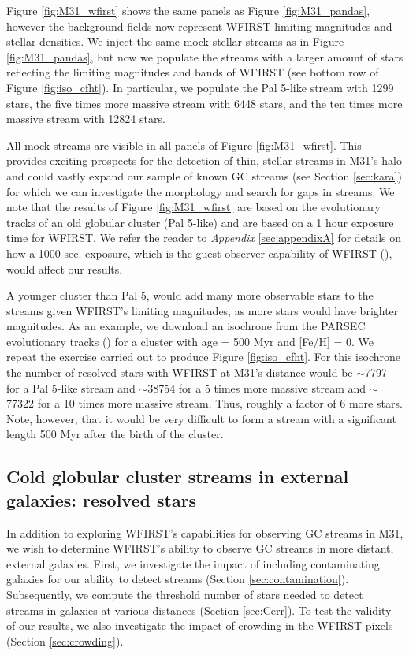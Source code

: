 \documentclass[twocolumn]{aastex62}
\begin{document}
Figure \ref{fig:M31_wfirst} shows the same panels as Figure \ref{fig:M31_pandas}, however the background fields now represent WFIRST limiting magnitudes and stellar densities. We inject the same mock stellar streams as in Figure \ref{fig:M31_pandas}, but now we populate the streams with a larger amount of stars reflecting the limiting magnitudes and bands of WFIRST (see bottom row of Figure \ref{fig:iso_cfht}). In particular, we populate the Pal 5-like stream with 1299 stars, the five times more massive stream with 6448 stars, and the ten times more massive stream with 12824 stars.

All mock-streams are visible in all panels of Figure \ref{fig:M31_wfirst}. This provides exciting prospects for the detection of thin, stellar streams in M31's halo and could vastly expand our sample of known GC streams (see Section \ref{sec:kara}) for which we can investigate the morphology and search for gaps in streams. We note that the results of  Figure \ref{fig:M31_wfirst} are based on the evolutionary tracks of an old globular cluster (Pal 5-like) and are based on a 1 hour exposure time for WFIRST. We refer the reader to {\it Appendix} \ref{sec:appendixA} for details on how a 1000 sec. exposure, which is the guest observer capability of WFIRST (\citealt{spergel13}), would affect our results. 

A younger cluster than Pal 5, would add many more observable stars to the streams given WFIRST's limiting magnitudes, as more stars would have brighter magnitudes. As an example, we download an isochrone from the PARSEC evolutionary tracks (\citealt{bressan12}) for a cluster with age = 500 Myr and  [Fe/H] = 0. We repeat the exercise carried out to produce Figure \ref{fig:iso_cfht}. For this isochrone the number of resolved stars with WFIRST at M31's distance would be ${\sim}$7797 for a Pal 5-like stream and ${\sim}$38754 for a 5  times more massive stream and ${\sim}$77322 for a 10 times more massive stream. Thus, roughly a factor of 6 more stars. 
Note, however, that it would be very difficult to form a stream with a significant length 500 Myr after the birth of the cluster. 

\subsection{Cold globular cluster streams in external galaxies: resolved stars}
\label{sec:resother}
In addition to exploring WFIRST's capabilities for observing GC streams in M31, we wish to determine WFIRST's ability to observe GC streams in more distant, external galaxies. First, we investigate the impact of including contaminating galaxies for our ability to detect streams (Section \ref{sec:contamination}). Subsequently, we compute the threshold number of stars needed to detect streams in galaxies at various distances (Section \ref{sec:Cerr}). To test the validity of our results, we also investigate the impact of crowding in the WFIRST pixels (Section \ref{sec:crowding}).
\end{document}

